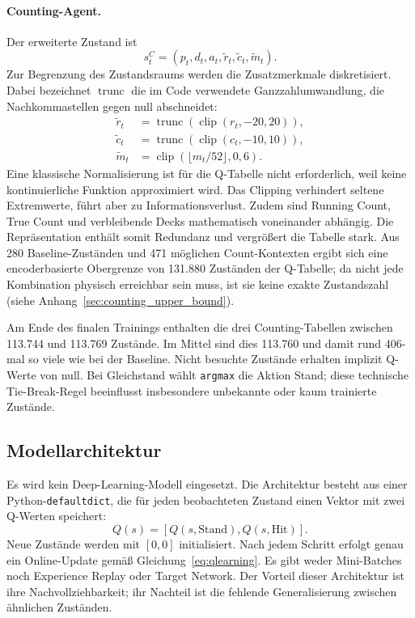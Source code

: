 \paragraph{Counting-Agent.}
Der erweiterte Zustand ist
\begin{equation}
  s_t^{C}=(p_t,d_t,a_t,\tilde r_t,\tilde c_t,\tilde m_t).
\end{equation}
Zur Begrenzung des Zustandsraums werden die Zusatzmerkmale
diskretisiert. Dabei bezeichnet $\operatorname{trunc}$ die im Code
verwendete Ganzzahlumwandlung, die Nachkommastellen gegen null abschneidet:
\begin{align}
  \tilde r_t &= \operatorname{trunc}(\operatorname{clip}(r_t,-20,20)),\\
  \tilde c_t &= \operatorname{trunc}(\operatorname{clip}(c_t,-10,10)),\\
  \tilde m_t &= \operatorname{clip}(\lfloor m_t/52\rfloor,0,6).
\end{align}
Eine klassische Normalisierung ist für die Q-Tabelle nicht
erforderlich, weil keine kontinuierliche Funktion approximiert wird.
Das Clipping verhindert seltene Extremwerte, führt aber zu
Informationsverlust. Zudem sind Running Count, True Count und
verbleibende Decks mathematisch voneinander abhängig. Die
Repräsentation enthält somit Redundanz und vergrößert die Tabelle stark.
Aus 280 Baseline-Zuständen und 471 möglichen Count-Kontexten ergibt sich
eine encoderbasierte Obergrenze von 131.880 Zuständen der Q-Tabelle; da
nicht jede Kombination physisch erreichbar sein muss, ist sie keine exakte
Zustandszahl (siehe Anhang~\ref{sec:counting_upper_bound}).

Am Ende des finalen Trainings enthalten die drei Counting-Tabellen
zwischen 113.744 und 113.769 Zustände. Im Mittel sind dies 113.760
und damit rund 406-mal so viele wie bei der Baseline. Nicht besuchte
Zustände erhalten implizit Q-Werte von null. Bei Gleichstand wählt
\texttt{argmax} die Aktion Stand; diese technische Tie-Break-Regel
beeinflusst insbesondere unbekannte oder kaum trainierte Zustände.

\subsection{Modellarchitektur}

Es wird kein Deep-Learning-Modell eingesetzt. Die Architektur besteht
aus einer Python-\texttt{defaultdict}, die für jeden beobachteten
Zustand einen Vektor mit zwei Q-Werten speichert:
\begin{equation}
  Q(s)=[Q(s,\text{Stand}),Q(s,\text{Hit})].
\end{equation}
Neue Zustände werden mit $[0,0]$ initialisiert. Nach jedem Schritt
erfolgt genau ein Online-Update gemäß Gleichung~\ref{eq:qlearning}.
Es gibt weder Mini-Batches noch Experience Replay oder Target
Network. Der Vorteil dieser Architektur ist ihre Nachvollziehbarkeit;
ihr Nachteil ist die fehlende Generalisierung zwischen ähnlichen Zuständen.

